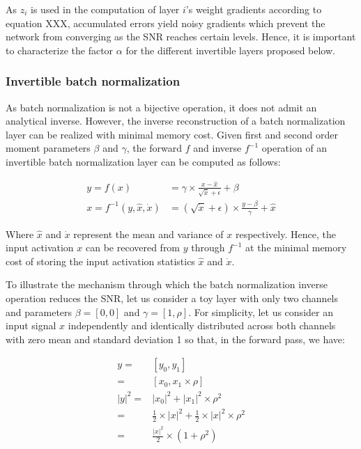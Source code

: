 \documentclass[twocolumn]{bmcart}
\begin{document}
As $z_i$ is used in the computation of layer $i$'s weight gradients according to equation XXX,
accumulated errors yield noisy gradients which prevent the network from converging as the SNR reaches certain levels.
Hence, it is important to characterize the factor $\alpha$ for the different invertible layers proposed below.

\subsubsection{Invertible batch normalization}

As batch normalization is not a bijective operation, it does not admit an analytical inverse.
However, the inverse reconstruction of a batch normalization layer can be realized with minimal memory cost.
Given first and second order moment parameters $\beta$ and $\gamma$, the forward $f$ and inverse $f^{-1}$ operation of an invertible batch normalization layer can be computed as follows:

\begin{subequations}
\begin{align}
y = f(x) &= \gamma \times \frac{x - \hat{x}}{\sqrt{\dot{x}} + \epsilon} + \beta \\
x = f^{-1}(y, \hat{x}, \dot{x}) &= (\sqrt{\dot{x}} + \epsilon) \times \frac{y -  \beta}{\gamma}  + \hat{x}
\end{align}
\end{subequations}

Where $\hat{x}$ and $\dot{x}$ represent the mean and variance of $x$ respectively.
Hence, the input activation $x$ can be recovered from $y$ through $f^{-1}$ at the minimal memory cost of storing the input activation statistics $\hat{x}$ and $\dot{x}$.

To illustrate the mechanism through which the batch normalization inverse operation reduces the SNR,
let us consider a toy layer with only two channels and parameters $\beta=[0,0]$ and $\gamma = [1, \rho]$.
For simplicity, let us consider an input signal $x$ independently and identically distributed across both channels
with zero mean and standard deviation 1 so that, in the forward pass, we have:

\begin{subequations}
\begin{align}
 y =& [y_0, y_1] \\
   =& [x_0, x_1 \times \rho] \\
|y|^2 =& |x_0|^2 + |x_1|^2 \times \rho^2 \\
      =& \frac{1}{2} \times |x|^2 + \frac{1}{2} \times |x|^2 \times \rho^2 \\
      =& \frac{|x|^2}{2} \times (1+\rho^2)
\end{align}
\end{subequations}
\end{document}
